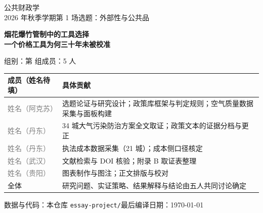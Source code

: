 \begin{titlepage}
\centering
\vspace*{1.5cm}

{\small 公共财政学\\[0.3em] 2026 年秋季学期\quad 第 1 场选题：外部性与公共品}

\vspace{1.2cm}

{\LARGE\bfseries 烟花爆竹管制中的工具选择}\\[0.5em]
{\LARGE\bfseries 一个价格工具为何三十年未被校准}

\vspace{1.0cm}

{\large 组别：第 \underline{\hspace{1.5em}} 组\quad 成员：5 人}

\vspace{2.2cm}

\begin{center}
\begin{tabular}{L{3.0cm}L{9.6cm}}
\toprule
\textbf{成员（姓名待填）} & \textbf{具体贡献} \\
\midrule
\textcolor{gray}{姓名（阿克苏）} & 选题论证与研究设计；政策库框架与判定规则；空气质量数据采集与面板构建 \\
\textcolor{gray}{姓名（丹东）} & 34 城大气污染防治方案全文取证；政策文本的证据分档与更正 \\
\textcolor{gray}{姓名（丹东）} & 执法成本数据采集（21 城）；成本侧口径核定 \\
\textcolor{gray}{姓名（武汉）} & 文献检索与 DOI 核验；附录 B 取证表整理 \\
\textcolor{gray}{姓名（贵阳）} & 图表制作与图注；正文排版与校对 \\
\midrule
全体 & 研究问题、实证策略、结果解释与结论由五人共同讨论确定 \\
\bottomrule
\end{tabular}
\end{center}

\vfill
{\small 数据与代码：本仓库 \texttt{essay-project/}\quad 最后编译日期：\today}
\end{titlepage}
